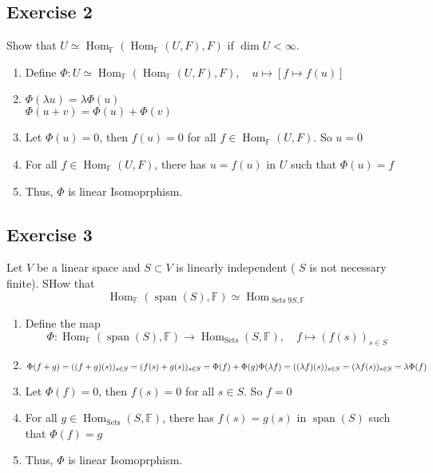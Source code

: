 \documentclass[11pt]{ctexart}
\theoremstyle{definition}
\numberwithin{equation}{section}
\newcommand{\sspan}{\operatorname{span}}%
\newcommand{\op}[1]{\operatorname{#1}}%
\newcommand{\FF}{\mathbb{F}}%
\theoremstyle{definition}
\theoremstyle{remark}
\begin{document}
\subsection{Exercise 2}
Show that $U\simeq \op{Hom}_{\FF}(\op{Hom}_{\FF}(U,F),F)$ if $\dim U < \infty$.
\begin{aaa}
    \begin{enumerate}
        \item Define $\Phi:U\simeq \op{Hom}_{\FF}(\op{Hom}_{\FF}(U,F),F),\quad u \mapsto [f\mapsto f(u)]$
        \item $\Phi(\lambda u)=\lambda \Phi(u)$\\$\Phi(u+v)=\Phi(u)+\Phi(v)$
        \item Let $\Phi(u)=0$, then $f(u)=0$ for all $f\in \op{Hom}_{\FF}(U,F)$. So $u=0$
        \item For all $f\in \op{Hom}_{\FF}(U,F)$, there has $u=f(u)$ in $U$ such that $\Phi(u)=f$
        \item Thus, $\Phi$ is linear Isomoprphism.
    \end{enumerate}
\end{aaa}
\subsection{Exercise 3}
Let $V$ be a linear space and $S \subset V$ is linearly independent ( $S$ is not necessary finite). SHow that\[\op{Hom}_{\FF}(\sspan(S),\FF)\simeq \op{Hom}_{\op{Sets}9S,\FF}\]
\begin{aaa}
    \begin{enumerate}
        \item Define the map \[\Phi: \op{Hom}_{\FF}(\sspan(S),\FF) \to \op{Hom}_{\op{Sets}}(S,\FF),\quad f\mapsto (f(s))_{s\in S}\]
        \item $\Phi(f+g)=((f+g)(s))_{s\in S}=(f(s)+g(s))_{s\in S}=\Phi(f)+\Phi(g)\\
        \Phi(\lambda f)=((\lambda f)(s))_{s\in S}=(\lambda f(s))_{s\in S}=\lambda \Phi(f)$
        \item Let $\Phi(f)=0$, then $f(s)=0$ for all $s\in S$. So $f=0$
        \item For all $g\in \op{Hom}_{\op{Sets}}(S,\FF)$, there has $f(s)=g(s)$ in $\sspan(S)$ such that $\Phi(f)=g$
        \item   Thus, $\Phi$ is linear Isomoprphism.
    \end{enumerate}
\end{aaa}
\end{document}
